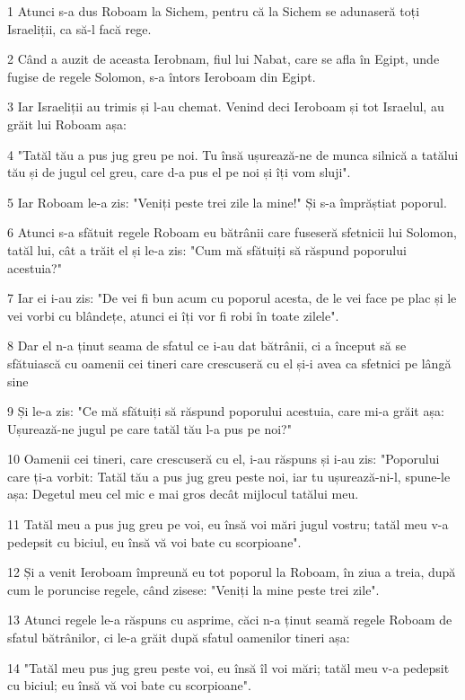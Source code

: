 \par 1 Atunci s-a dus Roboam la Sichem, pentru că la Sichem se adunaseră toți Israeliții, ca să-l facă rege.
\par 2 Când a auzit de aceasta Ierobnam, fiul lui Nabat, care se afla în Egipt, unde fugise de regele Solomon, s-a întors Ieroboam din Egipt.
\par 3 Iar Israeliții au trimis și l-au chemat. Venind deci Ieroboam și tot Israelul, au grăit lui Roboam așa:
\par 4 "Tatăl tău a pus jug greu pe noi. Tu însă ușurează-ne de munca silnică a tatălui tău și de jugul cel greu, care d-a pus el pe noi și îți vom sluji".
\par 5 Iar Roboam le-a zis: "Veniți peste trei zile la mine!" Și s-a împrăștiat poporul.
\par 6 Atunci s-a sfătuit regele Roboam eu bătrânii care fuseseră sfetnicii lui Solomon, tatăl lui, cât a trăit el și le-a zis: "Cum mă sfătuiți să răspund poporului acestuia?"
\par 7 Iar ei i-au zis: "De vei fi bun acum cu poporul acesta, de le vei face pe plac și le vei vorbi cu blândețe, atunci ei îți vor fi robi în toate zilele".
\par 8 Dar el n-a ținut seama de sfatul ce i-au dat bătrânii, ci a început să se sfătuiască cu oamenii cei tineri care crescuseră cu el și-i avea ca sfetnici pe lângă sine
\par 9 Și le-a zis: "Ce mă sfătuiți să răspund poporului acestuia, care mi-a grăit așa: Ușurează-ne jugul pe care tatăl tău l-a pus pe noi?"
\par 10 Oamenii cei tineri, care crescuseră cu el, i-au răspuns și i-au zis: "Poporului care ți-a vorbit: Tatăl tău a pus jug greu peste noi, iar tu ușurează-ni-l, spune-le așa: Degetul meu cel mic e mai gros decât mijlocul tatălui meu.
\par 11 Tatăl meu a pus jug greu pe voi, eu însă voi mări jugul vostru; tatăl meu v-a pedepsit cu biciul, eu însă vă voi bate cu scorpioane".
\par 12 Și a venit Ieroboam împreună eu tot poporul la Roboam, în ziua a treia, după cum le poruncise regele, când zisese: "Veniți la mine peste trei zile".
\par 13 Atunci regele le-a răspuns cu asprime, căci n-a ținut seamă regele Roboam de sfatul bătrânilor, ci le-a grăit după sfatul oamenilor tineri așa:
\par 14 "Tatăl meu pus jug greu peste voi, eu însă îl voi mări; tatăl meu v-a pedepsit cu biciul; eu însă vă voi bate cu scorpioane".
